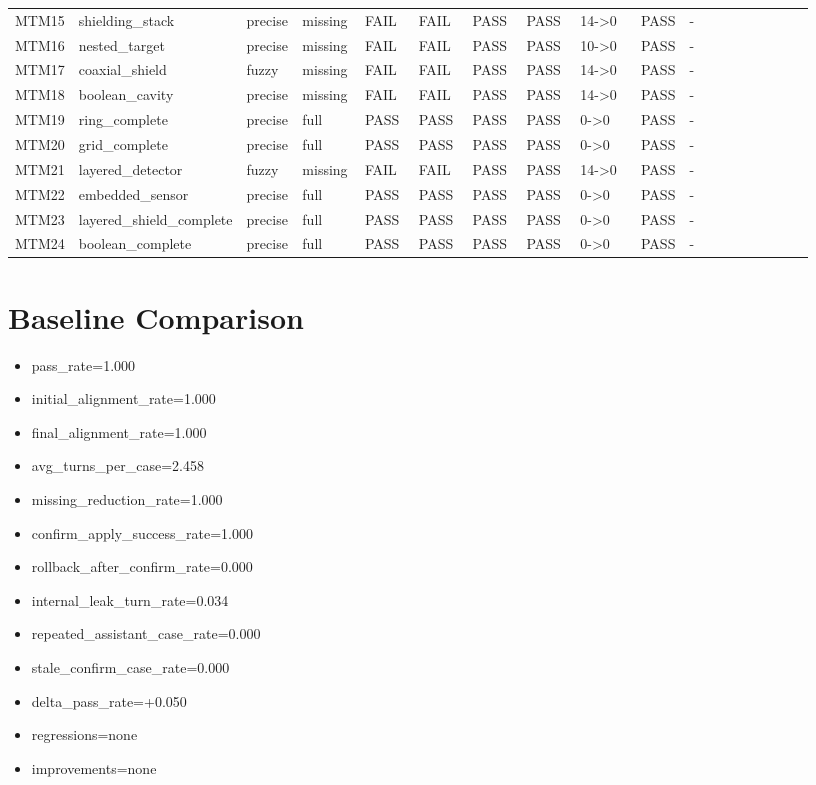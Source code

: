 \documentclass[11pt]{ctexart}
\begin{document}
\begin{longtable}{p{0.06\linewidth}p{0.08\linewidth}p{0.07\linewidth}p{0.08\linewidth}p{0.07\linewidth}p{0.07\linewidth}p{0.07\linewidth}p{0.07\linewidth}p{0.09\linewidth}p{0.06\linewidth}p{0.21\linewidth}}
MTM15 & shielding\_stack & precise & missing & FAIL & FAIL & PASS & PASS & 14->0 & PASS & - \\
MTM16 & nested\_target & precise & missing & FAIL & FAIL & PASS & PASS & 10->0 & PASS & - \\
MTM17 & coaxial\_shield & fuzzy & missing & FAIL & FAIL & PASS & PASS & 14->0 & PASS & - \\
MTM18 & boolean\_cavity & precise & missing & FAIL & FAIL & PASS & PASS & 14->0 & PASS & - \\
MTM19 & ring\_complete & precise & full & PASS & PASS & PASS & PASS & 0->0 & PASS & - \\
MTM20 & grid\_complete & precise & full & PASS & PASS & PASS & PASS & 0->0 & PASS & - \\
MTM21 & layered\_detector & fuzzy & missing & FAIL & FAIL & PASS & PASS & 14->0 & PASS & - \\
MTM22 & embedded\_sensor & precise & full & PASS & PASS & PASS & PASS & 0->0 & PASS & - \\
MTM23 & layered\_shield\_complete & precise & full & PASS & PASS & PASS & PASS & 0->0 & PASS & - \\
MTM24 & boolean\_complete & precise & full & PASS & PASS & PASS & PASS & 0->0 & PASS & - \\
\bottomrule
\end{longtable}
\section{Baseline Comparison}
\begin{itemize}
\item pass\_rate=1.000
\item initial\_alignment\_rate=1.000
\item final\_alignment\_rate=1.000
\item avg\_turns\_per\_case=2.458
\item missing\_reduction\_rate=1.000
\item confirm\_apply\_success\_rate=1.000
\item rollback\_after\_confirm\_rate=0.000
\item internal\_leak\_turn\_rate=0.034
\item repeated\_assistant\_case\_rate=0.000
\item stale\_confirm\_case\_rate=0.000
\item delta\_pass\_rate=+0.050
\item regressions=none
\item improvements=none
\end{itemize}
\appendix
\end{document}
